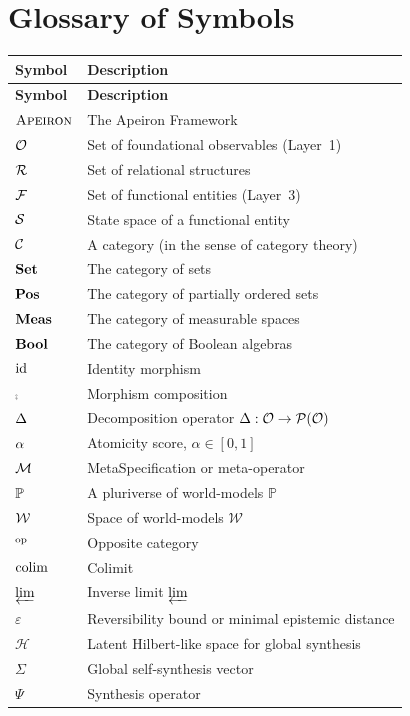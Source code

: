 \section{Glossary of Symbols}
\label{app:glossary}

\begin{longtable}{l p{10cm}}
\toprule
\textbf{Symbol} & \textbf{Description} \\
\midrule
\endfirsthead
\toprule
\textbf{Symbol} & \textbf{Description} \\
\midrule
\endhead
\bottomrule
\endfoot
$\textsc{Apeiron}$ & The Apeiron Framework \\
$\mathcal{O}$ & Set of foundational observables (Layer~1) \\
$\mathcal{R}$ & Set of relational structures \\
$\mathcal{F}$ & Set of functional entities (Layer~3) \\
$\mathcal{S}$ & State space of a functional entity \\
$\mathcal{C}$ & A category (in the sense of category theory) \\
$\mathbf{Set}$ & The category of sets \\
$\mathbf{Pos}$ & The category of partially ordered sets \\
$\mathbf{Meas}$ & The category of measurable spaces \\
$\mathbf{Bool}$ & The category of Boolean algebras \\
$\mathrm{id}$ & Identity morphism \\
$\comp$ & Morphism composition \\
$\Delta$ & Decomposition operator $\Delta: \mathcal{O} \to \mathcal{P}(\mathcal{O})$ \\
$\alpha$ & Atomicity score, $\alpha \in [0,1]$ \\
$\mathcal{M}$ & MetaSpecification or meta-operator \\
$\mathbb{P}$ & A pluriverse of world-models $\mathbb{P}$ \\
$\mathcal{W}$ & Space of world-models $\mathcal{W}$ \\
$^{\mathrm{op}}$ & Opposite category \\
$\mathrm{colim}$ & Colimit \\
$\varprojlim$ & Inverse limit $\varprojlim$ \\
$\varepsilon$ & Reversibility bound or minimal epistemic distance \\
$\mathcal{H}$ & Latent Hilbert-like space for global synthesis \\
$\Sigma$ & Global self-synthesis vector \\
$\Psi$ & Synthesis operator \\

\end{longtable}
